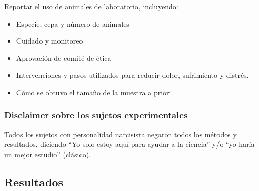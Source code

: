 \documentclass[
  10pt]{article}
\providecommand{\tightlist}{%
  \setlength{\itemsep}{0pt}\setlength{\parskip}{0pt}}\usepackage{longtable,booktabs,array}
\begin{document}
\begin{tcolorbox}
\end{tcolorbox}

\begin{tcolorbox}[enhanced jigsaw, colframe=quarto-callout-tip-color-frame, opacitybacktitle=0.6, coltitle=black, colback=white, left=2mm, breakable, bottomtitle=1mm, toptitle=1mm, titlerule=0mm, toprule=.15mm, opacityback=0, rightrule=.15mm, bottomrule=.15mm, colbacktitle=quarto-callout-tip-color!10!white, arc=.35mm, leftrule=.75mm, title=\textcolor{quarto-callout-tip-color}{\faLightbulb}\hspace{0.5em}{Animales de Laboratorio}]

Reportar el uso de animales de laboratorio, incluyendo:

\begin{itemize}
\tightlist
\item
  Especie, cepa y número de animales
\item
  Cuidado y monitoreo
\item
  Aprovación de comité de ética
\item
  Intervenciones y pasos utilizados para reducir dolor, sufrimiento y
  distrés.
\item
  Cómo se obtuvo el tamaño de la muestra a priori.
\end{itemize}

\end{tcolorbox}

\subsubsection{Disclaimer sobre los sujetos
experimentales}\label{disclaimer-sobre-los-sujetos-experimentales}

Todos los sujetos con personalidad narcisista negaron todos los métodos
y resultados, diciendo ``Yo solo estoy aquí para ayudar a la ciencia''
y/o ``yo haría un mejor estudio'' (clásico).

\subsection{Resultados}\label{resultados}
\end{document}
